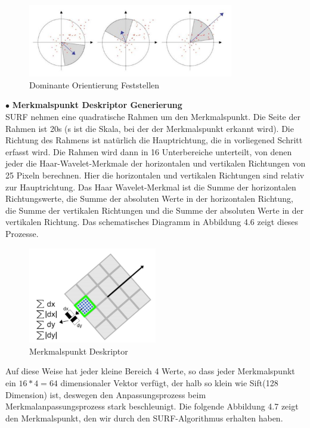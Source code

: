 \begin{figure}[htb]
 \centering 
 \includegraphics[keepaspectratio,width=0.8\textwidth]{images/3_Ersteverfahren/Dominante_Orientierung_Feststellen.pdf}
 \caption{Dominante Orientierung Feststellen}
 \label{fig:Dominante Orientierung Feststellen}
\end{figure} 


$\bullet$ \textbf{Merkmalspunkt Deskriptor Generierung}\\
SURF nehmen eine quadratische Rahmen um den Merkmalspunkt. Die Seite der Rahmen ist 20s (s ist die Skala, bei der der Merkmalspunkt erkannt wird). Die Richtung des Rahmens ist natürlich die Hauptrichtung, die in vorliegened Schritt erfasst wird. Die Rahmen wird dann in 16 Unterbereiche unterteilt, von denen jeder die Haar-Wavelet-Merkmale der horizontalen und vertikalen Richtungen von 25 Pixeln berechnen. Hier die horizontalen und vertikalen Richtungen sind relativ zur Hauptrichtung. Das Haar Wavelet-Merkmal ist die Summe der horizontalen Richtungswerte, die Summe der absoluten Werte in der horizontalen Richtung, die Summe der vertikalen Richtungen und die Summe der absoluten Werte in der vertikalen Richtung. Das schematisches Diagramm in Abbildung 4.6 zeigt dieses Prozesse.

\begin{figure}[htb]
 \centering 
 \includegraphics[keepaspectratio,width=0.5\textwidth]{images/3_Ersteverfahren/Merkmalspunkt_Deskriptor.pdf}
 \caption{Merkmalspunkt Deskriptor}
 \label{fig:Merkmalspunkt Deskriptor}
\end{figure} 

Auf diese Weise hat jeder kleine Bereich 4 Werte, so dass jeder Merkmalspunkt ein $16*4=64$ dimensionaler Vektor verfügt, der halb so klein wie Sift(128 Dimension) ist, deswegen den Anpassungsprozess beim Merkmalanpassungsprozess stark beschleunigt. Die folgende Abbildung 4.7 zeigt den Merkmalspunkt, den wir durch den SURF-Algorithmus erhalten haben.

